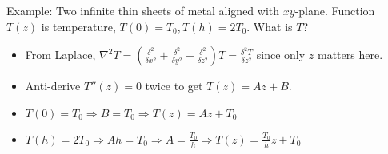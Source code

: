 \documentclass[11pt, oneside]{article}   	%
\begin{document}
Example: Two infinite thin sheets of metal aligned with $xy$-plane.  Function $T(z)$ is temperature, $T(0) = T_0, T(h)= 2T_0$.  What is $T$?

\begin{itemize}
\item From Laplace, $\nabla^2 T = (\frac{\delta^2}{\delta x^2} +  \frac{\delta^2}{\delta y^2} +  \frac{\delta^2}{\delta z^2})T = \frac{\delta^2T}{\delta z^2}$ since only $z$ matters here.
\item Anti-derive $T''(z) = 0$ twice to get $T(z) = Az+B$.  
\item $T(0) = T_0 \Rightarrow B = T_0 \Rightarrow T(z) = Az+T_0$
\item $T(h) = 2T_0 \Rightarrow Ah = T_0 \Rightarrow A = \frac{T_0}{h} \Rightarrow T(z) = \frac{T_0}{h}z+ T_0$
\end{itemize}
\end{document}
